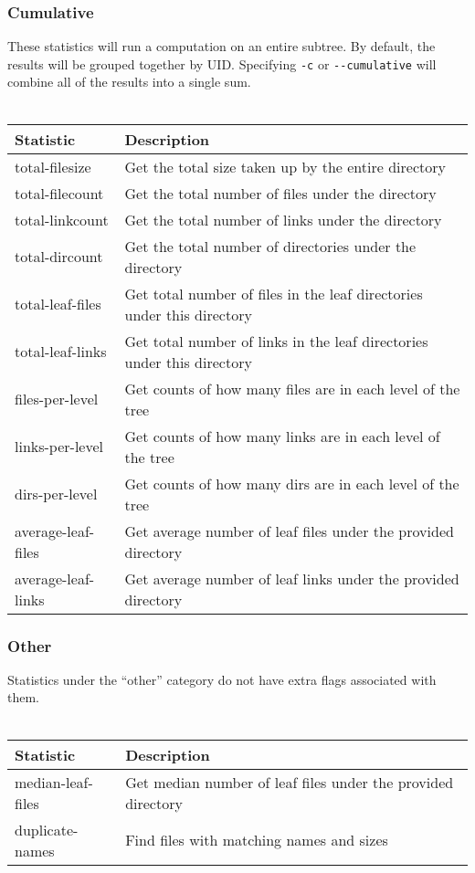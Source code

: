 \subsubsection{Cumulative}
These statistics will run a computation on an entire subtree. By
default, the results will be grouped together by UID. Specifying
\texttt{-c} or \texttt{-{}-cumulative} will combine all of the results
into a single sum.
\\\\
\begin{tabular} {| l | l |}
  \hline
  Statistic & Description \\
  \hline
  total-filesize & Get the total size taken up by the entire directory
  \\
  \hline
  total-filecount & Get the total number of files under the directory \\
  \hline
  total-linkcount & Get the total number of links under the directory \\
  \hline
  total-dircount & Get the total number of directories under the
  directory \\
  \hline
  total-leaf-files & Get total number of files in the leaf directories
  under this directory \\
  \hline
  total-leaf-links & Get total number of links in the leaf directories
  under this directory \\
  \hline
  files-per-level & Get counts of how many files are in each level of
  the tree \\
  \hline
  links-per-level & Get counts of how many links are in each level of
  the tree \\
  \hline
  dirs-per-level & Get counts of how many dirs are in each level of the
  tree \\
  \hline
  average-leaf-files & Get average number of leaf files under the
  provided directory \\
  \hline
  average-leaf-links & Get average number of leaf links under the
  provided directory \\
  \hline
\end{tabular}

\subsubsection{Other}
Statistics under the ``other'' category do not have extra flags
associated with them.
\\\\
\begin{tabular} {| l | l |}
  \hline
  Statistic & Description \\
  \hline
  median-leaf-files & Get median number of leaf files under the provided
  directory \\
  \hline
  duplicate-names & Find files with matching names and sizes \\
  \hline
\end{tabular}
